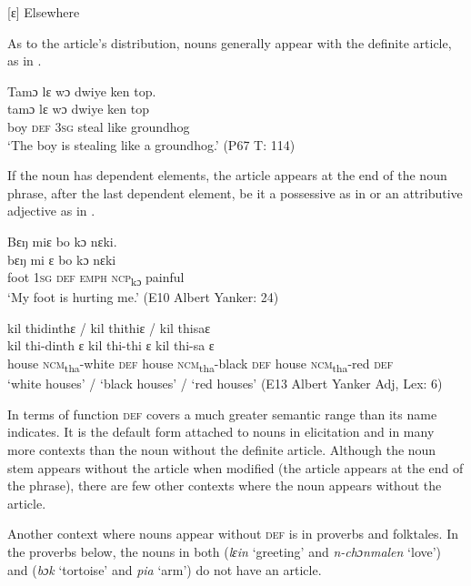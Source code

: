 [ɛ] Elsewhere\\
\z

As to the article's distribution, nouns generally appear with the definite article, as in .

\ea%
    \label{ex:72}
    Tamɔ lɛ wɔ dwiye ken top.\\
    \gll tamɔ    lɛ    wɔ    dwiye  ken    top\\
    boy    \textsc{def}  3\textsc{sg}  steal    like    groundhog\\
  \glt ‘The boy is stealing like a groundhog.' (P67 T: 114)
\z

If the noun has dependent elements, the article appears at the end of the noun phrase, after the last dependent element, be it a possessive as in  or an attributive adjective as in .

\ea%
    \label{ex:73}
    \ea \label{ex:73a} Bɛŋ miɛ bo kɔ nɛki.\\
    \gll bɛŋ  mi    ɛ     bo      kɔ      nɛki\\
    foot  \textsc{1sg}   \textsc{def}  \textsc{emph}    \textsc{ncp}\textsubscript{kɔ}    painful\\
    \glt ‘My foot is hurting me.' (E10 Albert Yanker: 24)
    
    \ex \label{ex:73b} kil thidinthɛ / kil thithiɛ /  kil thisaɛ\\
    \gll kil      thi-dinth      ɛ    kil      thi-thi      ɛ    kil     thi-sa      ɛ\\
    house    \textsc{ncm}\textsubscript{tha}{}-white  \textsc{def}  house    \textsc{ncm}\textsubscript{tha}{}-black  \textsc{def}  house    \textsc{ncm}\textsubscript{tha}{}-red  \textsc{def}\\
    \glt ‘white houses' / ‘black houses' / ‘red houses' (E13 Albert Yanker Adj, Lex: 6)
\z
\z

In terms of function \textsc{def} covers a much greater semantic range than its name indicates. It is the default form attached to nouns in elicitation and in many more contexts than the noun without the definite article. Although the noun stem appears without the article when modified (the article appears at the end of the phrase), there are few other contexts where the noun appears without the article.

Another context where nouns appear without \textsc{def} is in proverbs and folktales. In the proverbs below, the nouns in both  (\textit{lɛin} ‘greeting' and \textit{n-chɔnmalen} ‘love') and  (\textit{bɔk} ‘tortoise' and \textit{pia} ‘arm') do not have an article.

